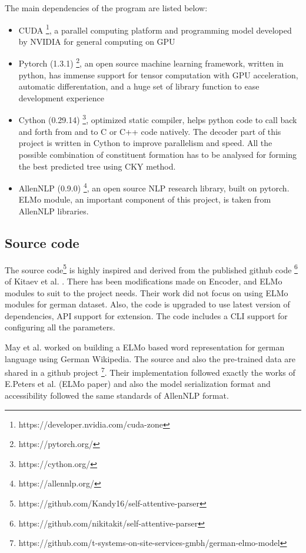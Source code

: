 \documentclass[a4paper, 11pt]{article}
\begin{document}
The main dependencies of the program are listed below:
\begin{itemize}
\item CUDA \footnote{https://developer.nvidia.com/cuda-zone}, a parallel computing platform and programming model developed by NVIDIA for general computing on GPU
\item Pytorch (1.3.1) \footnote{https://pytorch.org/}, an open source machine learning framework, written in python, has immense support for tensor computation with GPU acceleration, automatic differentation, and a huge set of library function to ease development experience
\item Cython (0.29.14) \footnote{https://cython.org/}, optimized static compiler, helps python code to call back and forth from and to C or C++ code natively. The decoder part of this project is written in Cython to improve parallelism and speed. All the possible combination of constituent formation has to be analysed for forming the best predicted tree using CKY method.
\item AllenNLP (0.9.0) \footnote{https://allennlp.org/}, an open source NLP research library, built on pytorch. ELMo module, an important component of this project, is taken from AllenNLP libraries.  
\end{itemize}

\subsection{Source code}

The source code\footnote{https://github.com/Kandy16/self-attentive-parser} is highly inspired and derived from the published github code \footnote{https://github.com/nikitakit/self-attentive-parser} of Kitaev et al. \parencite*{Kitaev2019}. There has been modifications made on Encoder, and ELMo modules to suit to the project needs. Their work did not focus on using ELMo modules for german dataset. Also, the code is upgraded to use latest version of dependencies, API support for extension. The code includes a CLI support for configuring all the parameters.


May et al. \parencite*{GerElmo} worked on building a ELMo based word representation for german language using German Wikipedia. The source and also the pre-trained data are shared in a github project \footnote{https://github.com/t-systems-on-site-services-gmbh/german-elmo-model}. Their implementation followed exactly the works of E.Peters et al. (ELMo paper) and also the model serialization format and accessibility followed the same standards of AllenNLP format.
\end{document}
